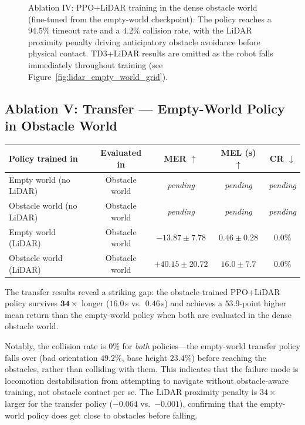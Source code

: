\documentclass{article}
\begin{document}
\begin{figure}[H]
    \caption{
    Ablation IV: PPO+LiDAR training in the dense obstacle world (fine-tuned from
    the empty-world checkpoint). The policy reaches a $94.5\%$ timeout rate and
    a $4.2\%$ collision rate, with the LiDAR proximity penalty driving anticipatory
    obstacle avoidance before physical contact.
    TD3+LiDAR results are omitted as the robot falls immediately throughout
    training (see Figure~\ref{fig:lidar_empty_world_grid}).
    }
    \label{fig:ppo_lidar_obstacle_world_grid}
\end{figure}

\subsection{Ablation V: Transfer — Empty-World Policy in Obstacle World}

\begin{center}
\begin{tabular}{lcccc}
  \toprule
  \textbf{Policy trained in} & \textbf{Evaluated in}
    & \textbf{MER} $\uparrow$ & \textbf{MEL (s)} $\uparrow$ & \textbf{CR} $\downarrow$ \\
  \midrule
  Empty world (no LiDAR)    & Obstacle world & \textit{pending} & \textit{pending} & \textit{pending} \\
  Obstacle world (no LiDAR) & Obstacle world & \textit{pending} & \textit{pending} & \textit{pending} \\
  Empty world (LiDAR)       & Obstacle world & $-13.87 \pm 7.78$ & $0.46 \pm 0.28$ & $0.0\%$ \\
  Obstacle world (LiDAR)    & Obstacle world & $+40.15 \pm 20.72$ & $16.0 \pm 7.7$ & $0.0\%$ \\
  \bottomrule
\end{tabular}
\end{center}

The transfer results reveal a striking gap: the obstacle-trained PPO+LiDAR
policy survives $\mathbf{34\times}$ longer ($16.0$\,s vs.\ $0.46$\,s) and
achieves a $\mathbf{53.9}$-point higher mean return than the empty-world
policy when both are evaluated in the dense obstacle world.

Notably, the collision rate is $0\%$ for \emph{both} policies—the
empty-world transfer policy falls over (bad orientation $49.2\%$, base height
$23.4\%$) before reaching the obstacles, rather than colliding with them.
This indicates that the failure mode is locomotion destabilisation from
attempting to navigate without obstacle-aware training, not obstacle contact
per se.
The LiDAR proximity penalty is $34\times$ larger for the transfer policy
($-0.064$ vs.\ $-0.001$), confirming that the empty-world policy does get
close to obstacles before falling.
\end{document}
